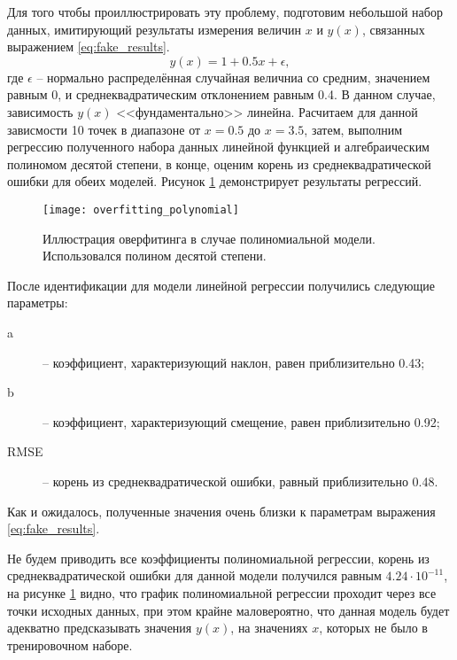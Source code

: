 	Для того чтобы проиллюстрировать эту проблему, подготовим небольшой набор
	данных, имитирующий результаты измерения величин $x$ и $y(x)$, связанных 
	выражением \ref{eq:fake_results}.
	\begin{equation}
		\label{eq:fake_results}
		y(x) = 1 + 0.5x + \epsilon,
	\end{equation}
	где $\epsilon$ -- нормально распределённая случайная величниа со средним,
	значением равным 0, и среднеквадратическим отклонением равным 0.4.
	В данном случае, зависимость $y(x)$ <<фундаментально>> линейна. Расчитаем
	для данной зависмости 10 точек в диапазоне от $x=0.5$ до $x=3.5$, затем, 
	выполним регрессию полученного набора данных линейной функцией и 
	алгебраическим полиномом десятой степени, в конце, оценим корень из
	среднеквадратической ошибки для обеих моделей. Рисунок 
	\ref{pic:overfitting_polynomial} демонстрирует результаты регрессий.

    \begin{figure}[!htp]
        \centering
        \texttt{[image: overfitting\_polynomial]}
        \caption{Иллюстрация оверфитинга в случае полиномиальной модели.
                 Использовался полином десятой степени.}
        \label{pic:overfitting_polynomial}
    \end{figure}

    После идентификации для модели линейной регрессии получились следующие 
    параметры:
    \begin{description}
    	\item[a] -- коэффициент, характеризующий наклон, равен приблизительно 0.43;
    	\item[b] -- коэффициент, характеризующий смещение, равен приблизительно 0.92;
    	\item[RMSE] -- корень из среднеквадратической ошибки, равный приблизительно 0.48.
    \end{description}
    Как и ожидалось, полученные значения очень близки к параметрам выражения 
    \ref{eq:fake_results}.

    Не будем приводить все коэффициенты полиномиальной регрессии, корень из
    среднеквадратической ошибки для данной модели получился равным 
    $4.24 \cdot 10^{-11}$, на рисунке \ref{pic:overfitting_polynomial} видно, что
    график полиномиальной регрессии проходит через все точки исходных данных,
    при этом крайне маловероятно, что данная модель будет адекватно предсказывать
    значения $y(x)$, на значениях $x$, которых не было в тренировочном наборе.

